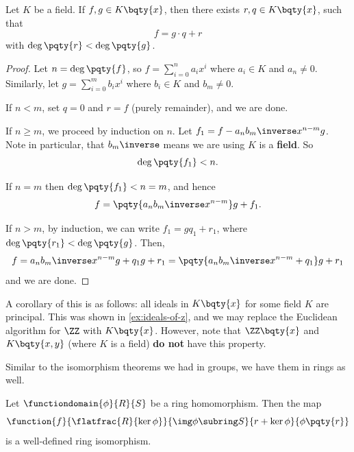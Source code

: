 \begin{proposition}
    \label{prop:euclidean-algorithm-polynomials}%
    Let \(K\) be a field. If \(f, g \in K \bqty{x}\), then there exists \(r, q \in K \bqty{x}\), such that
    \[
        f = g \cdot q + r
    \]
    with \(\deg \pqty{r} < \deg \pqty{g}\).
\end{proposition}

\begin{proof}
    Let \(n = \deg \pqty{f}\), so \(f = \sum_{i = 0}^{n} a_i x^i\) where \(a_i \in K\) and \(a_n \neq 0\).     Similarly, let \(g = \sum_{i = 0}^{m} b_i x^i\) where \(b_i \in K\) and \(b_m \neq 0\).

    If \(n < m\), set \(q = 0\) and \(r = f\) (purely remainder), and we are done.

    If \(n \geq m\), we proceed by induction on \(n\). Let \(f_1 = f - a_n b_m \inverse x^{n - m} g\). Note in particular, that \(b_m \inverse\) means we are using \(K\) is a \textbf{field}. So
    \[
        \deg \pqty{f_1} < n.
    \]

    If \(n = m\) then \(\deg \pqty{f_1} < n = m\), and hence
    \[
        f = \pqty{a_n b_m \inverse x^{n - m}} g + f_1.
    \]

    If \(n > m\), by induction, we can write \(f_1 = g q_1 + r_1\), where \(\deg \pqty{r_1} < \deg \pqty{g}\). Then,
    \[
        f = a_n b_m \inverse x^{n - m} g + q_1 g + r_1 = \pqty{a_n b_m \inverse x^{n - m} + q_1} g + r_1
    \]
    and we are done.
\end{proof}

A corollary of this is as follows: all ideals in \(K\bqty{x}\) for some field \(K\) are principal. This was shown in \autoref{ex:ideals-of-z}, and we may replace the Euclidean algorithm for \(\ZZ\) with \(K \bqty{x}\). However, note that \(\ZZ \bqty{x}\) and \(K \bqty{x, y}\) (where \(K\) is a field) \textbf{do not} have this property.

Similar to the isomorphism theorems we had in groups, we have them in rings as well.

\begin{theorem}
    \label{thm:first-isomorphism-theorem-ring}%
    Let \(\functiondomain{\phi}{R}{S}\) be a ring homomorphism. Then the map
    \[
        \function{f}{\flatfrac{R}{\ker \phi}}{\img \phi \subring S}{r + \ker \phi}{\phi\pqty{r}}
    \]
    is a well-defined ring isomorphism.
\end{theorem}

